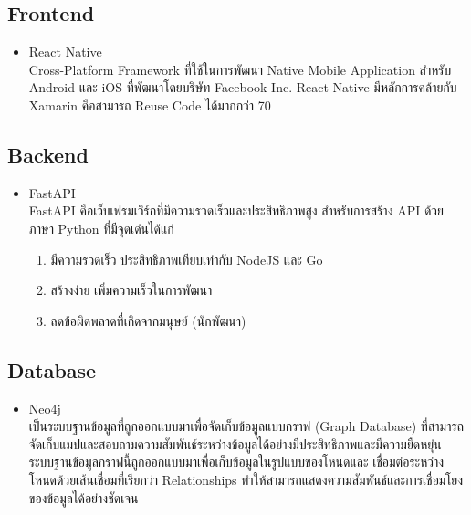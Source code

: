 \documentclass[14pt,oneside,openright,a4paper]{cpe-thai-project}
\begin{document}
  \subsection{Frontend}
    \begin{itemize}
      \item React Native \cite{ReactNative} \\ 
        Cross-Platform Framework ที่ใช้ในการพัฒนา Native Mobile Application สำหรับ Android และ iOS ที่พัฒนาโดยบริษัท Facebook Inc. 
        React Native มีหลักการคล้ายกับ Xamarin คือสามารถ Reuse Code ได้มากกว่า 70%
    \end{itemize}

  \subsection{Backend}
    \begin{itemize}
      \item FastAPI \cite{FastAPI} \\ 
        FastAPI คือเว็บเฟรมเวิร์กที่มีความรวดเร็วและประสิทธิภาพสูง สำหรับการสร้าง API ด้วยภาษา Python ที่มีจุดเด่นได้แก่
        \begin{enumerate}
          \item มีความรวดเร็ว ประสิทธิภาพเทียบเท่ากับ NodeJS และ Go 
          \item สร้างง่าย เพิ่มความเร็วในการพัฒนา
          \item ลดข้อผิดพลาดที่เกิดจากมนุษย์ (นักพัฒนา)
        \end{enumerate}
    \end{itemize}

  \subsection{Database}
    \begin{itemize}
      \item Neo4j \cite{Neo4j} \\ 
        เป็นระบบฐานข้อมูลที่ถูกออกแบบมาเพื่อจัดเก็บข้อมูลแบบกราฟ (Graph Database) ที่สามารถจัดเก็บแมปและสอบถามความสัมพันธ์ระหว่างข้อมูลได้อย่างมีประสิทธิภาพและมีความยืดหยุ่น ระบบฐานข้อมูลกราฟนี้ถูกออกแบบมาเพื่อเก็บข้อมูลในรูปแบบของโหนดและ เชื่อมต่อระหว่างโหนดด้วยเส้นเชื่อมที่เรียกว่า Relationships ทำให้สามารถแสดงความสัมพันธ์และการเชื่อมโยงของข้อมูลได้อย่างชัดเจน
    \end{itemize}
\end{document}
